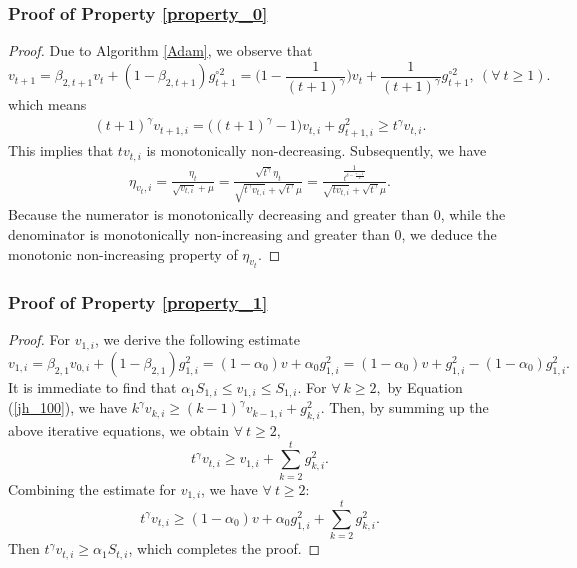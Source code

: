 \documentclass{article} %
\begin{document}
\subsubsection{Proof of Property \ref{property_0}}
\begin{proof}
Due to Algorithm \ref{Adam}, we observe that
\[v_{t+1}=\beta_{2,t+1}v_{t}+(1-\beta_{2,t+1})g_{t+1}^{\circ 2}=\Big(1-\frac{1}{(t+1)^{\gamma}}\Big)v_{t}+\frac{1}{(t+1)^{\gamma}}g_{t+1}^{\circ 2},\ (\forall\ t\ge 1).\]
which means
\begin{align}\label{jh_100}
(t+1)^{\gamma}v_{t+1,i}=\big((t+1)^{\gamma}-1\big)v_{t,i}+ g_{t+1,i}^{2}\ge t^{\gamma}v_{t,i}.
\end{align}
This implies that \(tv_{t,i}\) is monotonically non-decreasing. Subsequently, we have
\begin{align*}
\eta_{v_{t},i}=\frac{\eta_{t}}{\sqrt{v_{t,i}}+\mu}=\frac{\sqrt{t^{\gamma}}\eta_{t}}{\sqrt{t^{\gamma}v_{t,i}}+\sqrt{t^{\gamma}}\mu}=\frac{\frac{1}{t^{\delta-\frac{\gamma-1}{2}}}}{\sqrt{tv_{t,i}}+\sqrt{t^{\gamma}}\mu}.
\end{align*} Because the numerator is monotonically decreasing and greater than 0, while the denominator is monotonically non-increasing and greater than $0$, we deduce the monotonic non-increasing property of \(\eta_{v_{t}}.\)
\end{proof}     


\subsubsection{Proof of Property \ref{property_1}}
\begin{proof}
For $v_{1,i}$, we derive the following estimate
$$v_{1,i} =\beta_{2,1}v_{0,i} + (1-\beta_{2,1})g_{1,i}^{2} =(1-\alpha_{0})v+\alpha_{0}g_{1,i}^{2}=(1-\alpha_{0})v+g_{1,i}^{2}-(1-\alpha_{0})g_{1,i}^{2}.$$
It is immediate to find that $\alpha_{1}S_{1,i}\le v_{1,i}\le S_{1,i}.$ For $\forall\ k\ge 2,$ by Equation (\ref{jh_100}), we have $k^{\gamma}v_{k,i}\ge(k-1)^{\gamma}v_{k-1,i}+ g_{k,i}^{2}.$ Then, by summing up the above iterative equations, we obtain $\forall\ t\ge 2,$ $$t^{\gamma}v_{t,i}\ge v_{1,i}+\sum_{k=2}^{t}g_{k,i}^{2}.$$
Combining the estimate for $v_{1,i}$, we have $\forall\ t\ge 2$:
\[t^{\gamma}v_{t,i}\ge (1-\alpha_{0})v+\alpha_{0}g_{1,i}^{2}+\sum_{k=2}^{t}g_{k,i}^{2}.\]
Then \( t^{\gamma}v_{t,i}\ge \alpha_{1}S_{t,i}\), which completes the proof.
\end{proof}
\end{document}
